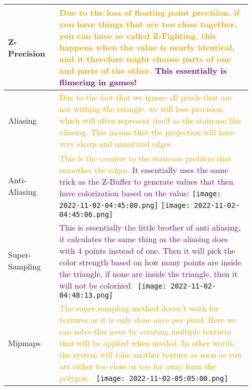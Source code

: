 \documentclass[main.tex,fontsize=8pt,paper=a4,paper=portrait,DIV=calc,]{scrartcl}
\begin{document}
\begin{table}[ht!]
\begin{tabular}{|m{0.2\linewidth}|m{0.755\linewidth}|}
\hline
Z-Precision & 
\textcolor{orange}{Due to the loss of floating point precision, if you have things that are too close together, you can have so called \textbf{Z-Fighting}, this happens when the value is nearly identical, and it therefore might choose parts of one and parts of the other.}\newline
\textcolor{purple}{This essentially is flimering in games!}\\
\hline
Aliasing & 
\textcolor{orange}{Due to the fact that we ignore all pixels that are not withing the triangle, we will lose precision, which will often represent itself as the staircase like aliasing. This means that the projection will have very sharp and unnatural edges.}\\
\hline
Anti-Aliasing & 
\textcolor{orange}{This is the counter to the staircase problem that smoothes the edges.}\newline
\textcolor{purple}{It essentially uses the same trick as the Z-Buffer to generate values that then have colorization based on the value:}\newline
\texttt{[image: 2022-11-02-04:45:00.png]} \texttt{[image: 2022-11-02-04:45:06.png]}\\
\hline
Super-Sampling & 
\textcolor{purple}{This is essentially the little brother of anti aliasing, it calculates the same thing as the aliasing does with 4 points instead of one.\newline
Then it will pick the color strength based on how many points are inside the triangle, if none are inside the triangle, then it will not be colorized}\newline
\, \newline
\texttt{[image: 2022-11-02-04:48:13.png]}\\
\hline
Mipmaps & 
\textcolor{orange}{The super sampling method doesn't work for textures as it is only done once per pixel.\newline
Here we can solve this issue by creating multiple textures that will be applied when needed.\newline
In other words, the system will take another texture as soon as you are either too close or too far away form the polygon.}\newline
\, \newline
\texttt{[image: 2022-11-02-05:05:00.png]}\\
\hline
\end{tabular}

\end{table}
\end{document}
